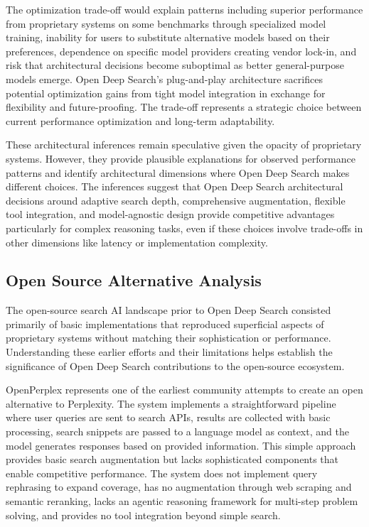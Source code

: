 The optimization trade-off would explain patterns including superior performance from proprietary systems on some benchmarks through specialized model training, inability for users to substitute alternative models based on their preferences, dependence on specific model providers creating vendor lock-in, and risk that architectural decisions become suboptimal as better general-purpose models emerge. Open Deep Search's plug-and-play architecture sacrifices potential optimization gains from tight model integration in exchange for flexibility and future-proofing. The trade-off represents a strategic choice between current performance optimization and long-term adaptability.

These architectural inferences remain speculative given the opacity of proprietary systems. However, they provide plausible explanations for observed performance patterns and identify architectural dimensions where Open Deep Search makes different choices. The inferences suggest that Open Deep Search architectural decisions around adaptive search depth, comprehensive augmentation, flexible tool integration, and model-agnostic design provide competitive advantages particularly for complex reasoning tasks, even if these choices involve trade-offs in other dimensions like latency or implementation complexity.

\subsection{Open Source Alternative Analysis}

The open-source search AI landscape prior to Open Deep Search consisted primarily of basic implementations that reproduced superficial aspects of proprietary systems without matching their sophistication or performance. Understanding these earlier efforts and their limitations helps establish the significance of Open Deep Search contributions to the open-source ecosystem.

OpenPerplex represents one of the earliest community attempts to create an open alternative to Perplexity. The system implements a straightforward pipeline where user queries are sent to search APIs, results are collected with basic processing, search snippets are passed to a language model as context, and the model generates responses based on provided information. This simple approach provides basic search augmentation but lacks sophisticated components that enable competitive performance. The system does not implement query rephrasing to expand coverage, has no augmentation through web scraping and semantic reranking, lacks an agentic reasoning framework for multi-step problem solving, and provides no tool integration beyond simple search.


